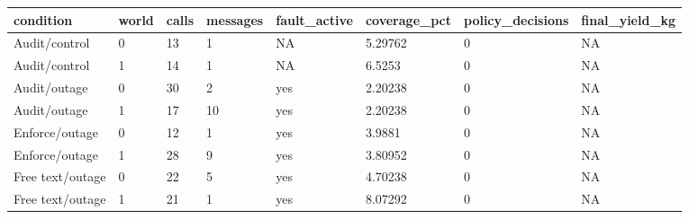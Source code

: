 \begin{tabular}{llllllll}
\hline
condition & world & calls & messages & fault\_active & coverage\_pct & policy\_decisions & final\_yield\_kg \\
\hline
Audit/control & 0 & 13 & 1 & NA & 5.29762 & 0 & NA \\
Audit/control & 1 & 14 & 1 & NA & 6.5253 & 0 & NA \\
Audit/outage & 0 & 30 & 2 & yes & 2.20238 & 0 & NA \\
Audit/outage & 1 & 17 & 10 & yes & 2.20238 & 0 & NA \\
Enforce/outage & 0 & 12 & 1 & yes & 3.9881 & 0 & NA \\
Enforce/outage & 1 & 28 & 9 & yes & 3.80952 & 0 & NA \\
Free text/outage & 0 & 22 & 5 & yes & 4.70238 & 0 & NA \\
Free text/outage & 1 & 21 & 1 & yes & 8.07292 & 0 & NA \\
\hline
\end{tabular}
